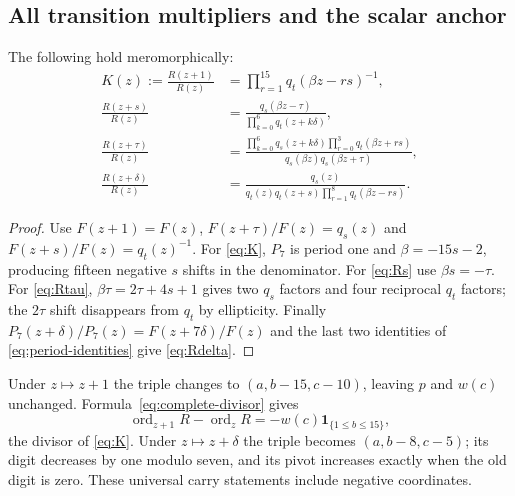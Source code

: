 \subsection{All transition multipliers and the scalar anchor}
\begin{theorem}\label{thm:transitions}
The following hold meromorphically:
\begin{align}
 K(z):=\frac{R(z+1)}{R(z)}&=\prod_{r=1}^{15}q_t(\beta z-rs)^{-1},\label{eq:K}\\
 \frac{R(z+s)}{R(z)}&=\frac{q_s(\beta z-\tau)}{\prod_{k=0}^{6}q_t(z+k\delta)},\label{eq:Rs}\\
 \frac{R(z+\tau)}{R(z)}&=
 \frac{\prod_{k=0}^{6}q_s(z+k\delta)\prod_{r=0}^{3}q_t(\beta z+rs)}
 {q_s(\beta z)q_s(\beta z+\tau)},\label{eq:Rtau}\\
 \frac{R(z+\delta)}{R(z)}&=
 \frac{q_s(z)}{q_t(z)q_t(z+s)\prod_{r=1}^{8}q_t(\beta z-rs)}.\label{eq:Rdelta}
\end{align}
\end{theorem}
\begin{proof}
Use $F(z+1)=F(z)$, $F(z+\tau)/F(z)=q_s(z)$ and $F(z+s)/F(z)=q_t(z)^{-1}$. For \eqref{eq:K}, $P_7$ is period one and $\beta=-15s-2$, producing fifteen negative $s$ shifts in the denominator. For \eqref{eq:Rs} use $\beta s=-\tau$. For \eqref{eq:Rtau}, $\beta\tau=2\tau+4s+1$ gives two $q_s$ factors and four reciprocal $q_t$ factors; the $2\tau$ shift disappears from $q_t$ by ellipticity. Finally $P_7(z+\delta)/P_7(z)=F(z+7\delta)/F(z)$ and the last two identities of \eqref{eq:period-identities} give \eqref{eq:Rdelta}.
\end{proof}
Under $z\mapsto z+1$ the triple changes to $(a,b-15,c-10)$, leaving $p$ and $w(c)$ unchanged. Formula~\eqref{eq:complete-divisor} gives
\[
 \operatorname{ord}_{z+1}R-\operatorname{ord}_zR
 =-w(c)\mathbf1_{\{1\le b\le15\}},
\]
the divisor of \eqref{eq:K}. Under $z\mapsto z+\delta$ the triple becomes $(a,b-8,c-5)$; its digit decreases by one modulo seven, and its pivot increases exactly when the old digit is zero. These universal carry statements include negative coordinates.

